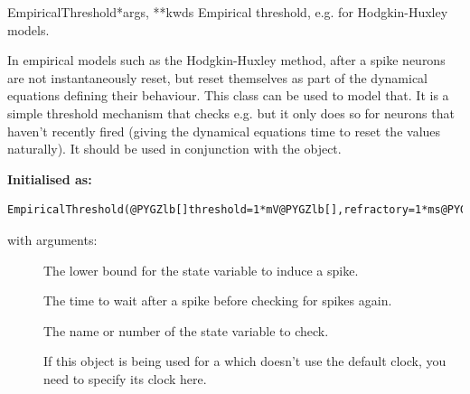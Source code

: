 \documentclass[letterpaper,10pt,english]{manual}
\begin{document}
\hypertarget{brian.EmpiricalThreshold}{}\begin{classdesc}{EmpiricalThreshold}{*args, **kwds}
Empirical threshold, e.g. for Hodgkin-Huxley models.

In empirical models such as the Hodgkin-Huxley method, after a spike
neurons are not instantaneously reset, but reset themselves
as part of the dynamical equations defining their behaviour. This class
can be used to model that. It is a simple threshold mechanism that
checks e.g.  but it only does so for neurons that haven't
recently fired (giving the dynamical equations time to reset
the values naturally). It should be used in conjunction with the
\hyperlink{brian.NoReset}{} object.

\textbf{Initialised as:}

\begin{Verbatim}[commandchars=@\[\]]
EmpiricalThreshold(@PYGZlb[]threshold=1*mV@PYGZlb[],refractory=1*ms@PYGZlb[],state=0@PYGZlb[],clock@PYGZrb[]@PYGZrb[]@PYGZrb[]@PYGZrb[])
\end{Verbatim}

with arguments:
\begin{description}
\item[] \leavevmode
The lower bound for the state variable to induce a spike.

\item[] \leavevmode
The time to wait after a spike before checking for spikes again.

\item[] \leavevmode
The name or number of the state variable to check.

\item[] \leavevmode
If this object is being used for a \hyperlink{brian.NeuronGroup}{} which doesn't
use the default clock, you need to specify its clock here.

\end{description}
\end{classdesc}
\end{document}

